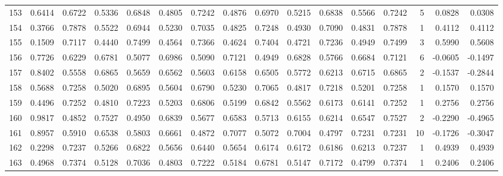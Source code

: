 \begin{tabular}{lrrrrrrrrrrrrrrr}
153 &      0.6414 &  0.6722 &  0.5336 &  0.6848 &  0.4805 &  0.7242 &  0.4876 &  0.6970 &  0.5215 &  0.6838 &   0.5566 &     0.7242 &      5 &                    0.0828 &                     0.0308 \\
154 &      0.3766 &  0.7878 &  0.5522 &  0.6944 &  0.5230 &  0.7035 &  0.4825 &  0.7248 &  0.4930 &  0.7090 &   0.4831 &     0.7878 &      1 &                    0.4112 &                     0.4112 \\
155 &      0.1509 &  0.7117 &  0.4440 &  0.7499 &  0.4564 &  0.7366 &  0.4624 &  0.7404 &  0.4721 &  0.7236 &   0.4949 &     0.7499 &      3 &                    0.5990 &                     0.5608 \\
156 &      0.7726 &  0.6229 &  0.6781 &  0.5077 &  0.6986 &  0.5090 &  0.7121 &  0.4949 &  0.6828 &  0.5766 &   0.6684 &     0.7121 &      6 &                   -0.0605 &                    -0.1497 \\
157 &      0.8402 &  0.5558 &  0.6865 &  0.5659 &  0.6562 &  0.5603 &  0.6158 &  0.6505 &  0.5772 &  0.6213 &   0.6715 &     0.6865 &      2 &                   -0.1537 &                    -0.2844 \\
158 &      0.5688 &  0.7258 &  0.5020 &  0.6895 &  0.5604 &  0.6790 &  0.5230 &  0.7065 &  0.4817 &  0.7218 &   0.5201 &     0.7258 &      1 &                    0.1570 &                     0.1570 \\
159 &      0.4496 &  0.7252 &  0.4810 &  0.7223 &  0.5203 &  0.6806 &  0.5199 &  0.6842 &  0.5562 &  0.6173 &   0.6141 &     0.7252 &      1 &                    0.2756 &                     0.2756 \\
160 &      0.9817 &  0.4852 &  0.7527 &  0.4950 &  0.6839 &  0.5677 &  0.6583 &  0.5713 &  0.6155 &  0.6214 &   0.6547 &     0.7527 &      2 &                   -0.2290 &                    -0.4965 \\
161 &      0.8957 &  0.5910 &  0.6538 &  0.5803 &  0.6661 &  0.4872 &  0.7077 &  0.5072 &  0.7004 &  0.4797 &   0.7231 &     0.7231 &     10 &                   -0.1726 &                    -0.3047 \\
162 &      0.2298 &  0.7237 &  0.5266 &  0.6822 &  0.5656 &  0.6440 &  0.5654 &  0.6174 &  0.6172 &  0.6186 &   0.6213 &     0.7237 &      1 &                    0.4939 &                     0.4939 \\
163 &      0.4968 &  0.7374 &  0.5128 &  0.7036 &  0.4803 &  0.7222 &  0.5184 &  0.6781 &  0.5147 &  0.7172 &   0.4799 &     0.7374 &      1 &                    0.2406 &                     0.2406 \\

\end{tabular}
